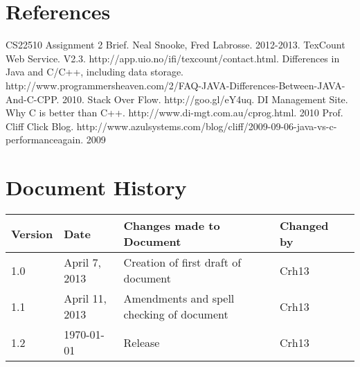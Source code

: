 \documentclass[a4paper]{article}
\begin{document}
\vspace{10mm} 
\begin{center}
\end{center}

\vspace{4mm}
\section{References}

\begin{thebibliography}{}

 CS22510 Assignment 2 Brief. Neal Snooke, Fred Labrosse.
2012-2013.
 TexCount Web Service. V2.3.
http://app.uio.no/ifi/texcount/contact.html.
 Differences in Java and C/C++, including data storage.
http://www.programmersheaven.com/2/FAQ-JAVA-Differences-Between-JAVA-And-C-CPP. 2010.
 Stack Over Flow. http://goo.gl/eY4uq.
 DI Management Site. Why C is better than C++. 
http://www.di-mgt.com.au/cprog.html. 2010
 Prof. Cliff Click Blog. http://www.azulsystems.com/blog/cliff/2009-09-06-java-vs-c-performanceagain. 2009

\end{thebibliography}

\section{Document History}

\begin{tabular}{|l | l | l | l | l |}

\hline

Version & Date & Changes made to Document & Changed by \\

\hline

1.0  & April 7, 2013 & Creation of first draft of document & Crh13\\
\hline
1.1  & April 11, 2013 & Amendments and spell checking of document & Crh13\\
\hline
1.2  & \today & Release & Crh13\\
\hline


\end{tabular}
\end{document}
